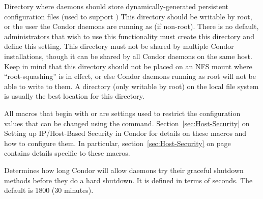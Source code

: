 \begin{description}
\label{param:PersistentConfigDir}
\item[\Macro{PERSISTENT\_CONFIG\_DIR}]
  Directory where daemons should store dynamically-generated
  persistent configuration files (used to support
   )
  This directory should  be writable by root, or the user
  the Condor daemons are running as (if non-root).
  There is no default, administrators that wish to use this
  functionality must create this directory and define this setting.
  This directory must not be shared by multiple Condor installations,
  though it can be shared by all Condor daemons on the same host.
  Keep in mind that this directory should not be placed on an NFS
  mount where ``root-squashing'' is in effect, or else Condor daemons
  running as root will not be able to write to them.
  A directory (only writable by root) on the local file system is
  usually the best location for this directory.

\label{param:SettableAttrs}
\item[\Macro{SETTABLE\_ATTRS\Dots}]
  All macros that begin with  or
   are settings used to restrict the 
  configuration values that can be changed using the  
  command.
  Section~\ref{sec:Host-Security} on Setting up
  IP/Host-Based Security in Condor for details on these
  macros and how to configure them.  
  In particular, section~\ref{sec:Host-Security}
  on page~\pageref{sec:Host-Security} contains details specific to
  these macros.

\label{param:ShutdownGracefulTimeout}
\item[\Macro{SHUTDOWN\_GRACEFUL\_TIMEOUT}]
  Determines how long
  Condor will allow daemons try their graceful shutdown methods
  before they do a hard shutdown.  It is defined in terms of seconds.
  The default is 1800 (30 minutes).


\end{description}
